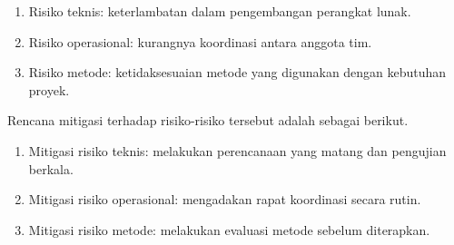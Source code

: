\begin{enumerate}
    \item Risiko teknis: keterlambatan dalam pengembangan perangkat lunak.
    \item Risiko operasional: kurangnya koordinasi antara anggota tim.
    \item Risiko metode: ketidaksesuaian metode yang digunakan dengan kebutuhan proyek.
\end{enumerate}

Rencana mitigasi terhadap risiko-risiko tersebut adalah sebagai berikut.

\begin{enumerate}
    \item Mitigasi risiko teknis: melakukan perencanaan yang matang dan pengujian berkala.
    \item Mitigasi risiko operasional: mengadakan rapat koordinasi secara rutin.
    \item Mitigasi risiko metode: melakukan evaluasi metode sebelum diterapkan.
\end{enumerate}

